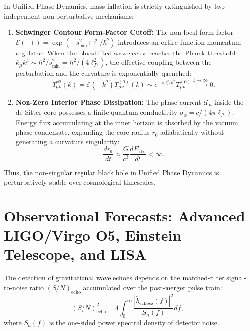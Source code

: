 \documentclass[11pt,a4paper]{article}
\begin{document}
In Unified Phase Dynamics, mass inflation is strictly extinguished by two independent non-perturbative mechanisms:
\begin{enumerate}
    \item \textbf{Schwinger Contour Form-Factor Cutoff:} The non-local form factor $\mathcal{E}(\Box) = \exp(-s_{\min}^2 \Box^2/\hbar^2)$ introduces an entire-function momentum regulator. When the blueshifted wavevector reaches the Planck threshold $k_\mu k^\mu \sim \hbar^2 / s_{\min}^2 = \hbar^2 / (4\ell_P^2)$, the effective coupling between the perturbation and the curvature is exponentially quenched:
    \begin{equation}
    T_{\mu\nu}^{\mathrm{eff}}(k) = \mathcal{E}(-k^2) T_{\mu\nu}^{(0)}(k) \sim e^{-4 \ell_P^2 k^2} T_{\mu\nu}^{(0)} \xrightarrow{k \to \infty} 0.
    \end{equation}
    
    \item \textbf{Non-Zero Interior Phase Dissipation:} The phase current $\mathcal{U}_\mu$ inside the de Sitter core possesses a finite quantum conductivity $\sigma_\phi = c / (4\pi \ell_P)$. Energy flux accumulating at the inner horizon is absorbed by the vacuum phase condensate, expanding the core radius $r_0$ adiabatically without generating a curvature singularity:
    \begin{equation}
    \frac{dr_0}{dt} \approx \frac{G}{c^3} \frac{dE_{\mathrm{abs}}}{dt} < \infty.
    \end{equation}
\end{enumerate}
Thus, the non-singular regular black hole in Unified Phase Dynamics is perturbatively stable over cosmological timescales.

\section{Observational Forecasts: Advanced LIGO/Virgo O5, Einstein Telescope, and LISA}

The detection of gravitational wave echoes depends on the matched-filter signal-to-noise ratio $(S/N)_{\mathrm{echo}}$ accumulated over the post-merger pulse train:
\begin{equation}
(S/N)_{\mathrm{echo}}^2 = 4 \int_{0}^{\infty} \frac{|\tilde{h}_{\mathrm{echoes}}(f)|^2}{S_n(f)} df,
\end{equation}
where $S_n(f)$ is the one-sided power spectral density of detector noise.
\end{document}
